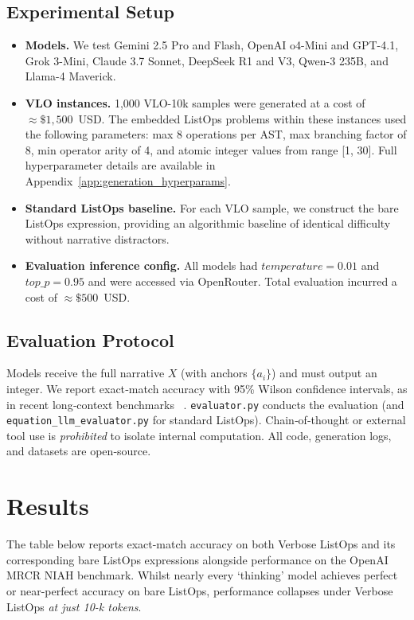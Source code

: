\documentclass{article}
\begin{document}
\subsection{Experimental Setup}
\label{subsec:exp-setup}
\begin{itemize}
  \item \textbf{Models.} We test Gemini 2.5 Pro and Flash, OpenAI o4-Mini and GPT-4.1, Grok 3-Mini, Claude 3.7 Sonnet, DeepSeek R1 and V3, Qwen-3 235B, and Llama-4 Maverick.
  \item \textbf{VLO instances.} 1,000 VLO-10k samples were generated at a cost of $\approx\$1,500$~USD. The embedded ListOps problems within these instances used the following parameters: max 8 operations per AST, max branching factor of 8, min operator arity of 4, and atomic integer values from range [1, 30]. Full hyperparameter details are available in Appendix~\ref{app:generation_hyperparams}.
  \item \textbf{Standard ListOps baseline.} For each VLO sample, we construct the bare ListOps expression, providing an algorithmic baseline of identical difficulty without narrative distractors.
  \item \textbf{Evaluation inference config.} All models had $temperature = 0.01$ and $top\_p = 0.95$ and were accessed via OpenRouter. Total evaluation incurred a cost of $\approx\$500$~USD.
\end{itemize}

\subsection{Evaluation Protocol}
\label{subsec:evaluation}
Models receive the full narrative $X$ (with anchors $\{a_i\}$) and must output an integer. We report exact‑match accuracy with 95\% Wilson confidence intervals, as in recent long‑context benchmarks ~\citep{l-eval, infinitebench}. \texttt{evaluator.py} conducts the evaluation (and \texttt{equation\_llm\_evaluator.py} for standard ListOps). Chain‑of‑thought or external tool use is \emph{prohibited} to isolate internal computation. All code, generation logs, and datasets are open‑source.

\section{Results}
\label{subsec:results}
The table below reports exact-match accuracy on both Verbose ListOps and its corresponding bare ListOps expressions alongside performance on the OpenAI MRCR NIAH benchmark. Whilst nearly every `thinking' model achieves perfect or near-perfect accuracy on bare ListOps, performance collapses under Verbose ListOps \emph{at just 10-k tokens}.
\end{document}
